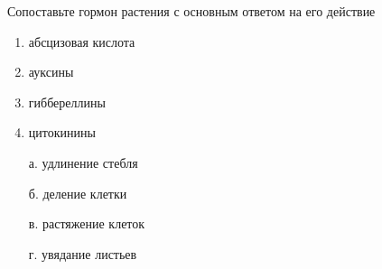 
Сопоставьте гормон растения с основным ответом на его действие

\begin{multicols}{2}
    {
        \begin{enumerate}
            \item абсцизовая кислота
            \item ауксины
            \item гиббереллины
            \item цитокинины
        \end{enumerate}
    }
    {
        \begin{enumerate}
            \item[а.] удлинение стебля
            \item[б.] деление клетки
            \item[в.] растяжение клеток
            \item[г.] увядание листьев
        \end{enumerate}
    }
\end{multicols}

